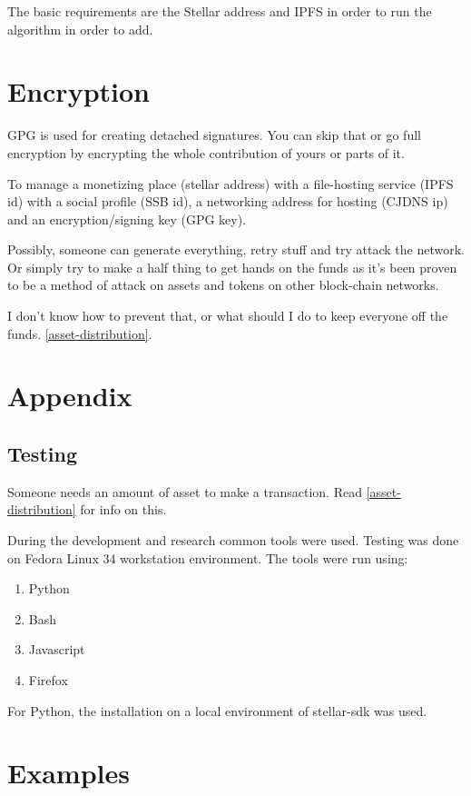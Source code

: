 \documentclass[10pt,a4paper,twocolumn]{paper}
\begin{document}
	The basic requirements are the Stellar address and IPFS in order to run the algorithm in order to add.
	
	\section{Encryption}
	GPG is used for creating detached signatures. You can skip that or go full encryption by encrypting the whole contribution of yours or parts of it.
	
	To manage a monetizing place (stellar address) with a file-hosting service (IPFS id) with a social profile (SSB id), a networking address for hosting (CJDNS ip) and an encryption/signing key (GPG key).

	Possibly, someone can generate everything, retry stuff and try attack the network. Or simply try to make a half thing to get hands on the funds as it's been proven to be a method of attack on assets and tokens on other block-chain networks.

	I don't know how to prevent that, or what should I do to keep everyone off the funds. \ref{asset-distribution}.
\section{Appendix}\label{appendix}
\subsection{Testing}\label{testing}

Someone needs an amount of asset to make a transaction. Read
\ref{asset-distribution} for info on this.

During the development and research common tools were used. Testing was done on Fedora Linux 34 workstation environment. The tools were run using:
\begin{enumerate}
	\item Python
	\item Bash
	\item Javascript
	\item Firefox
\end{enumerate}

For Python, the installation on a local environment of stellar-sdk was used.

\section{Examples}\label{examples}
\end{document}
